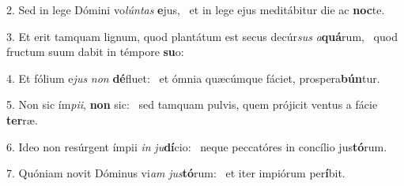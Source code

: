 2. Sed in lege Dómini vo\textit{lún}\textit{tas} \textbf{e}jus, \ast\  et in lege ejus meditábitur die ac \textbf{noc}te.\

3. Et erit tamquam lignum, quod plantátum est secus decúr\textit{sus} \textit{a}\textbf{quá}rum, \ast\  quod fructum suum dabit in témpore \textbf{su}o:\

4. Et fólium e\textit{jus} \textit{non} \textbf{dé}fluet: \ast\  et ómnia quæcúmque fáciet, prospera\textbf{bún}tur.\

5. Non sic ím\textit{pi}\textit{i}, \textbf{non} sic: \ast\  sed tamquam pulvis, quem prójicit ventus a fácie \textbf{ter}ræ.\

6. Ideo non resúrgent ímpii \textit{in} \textit{ju}\textbf{dí}cio: \ast\  neque peccatóres in concílio jus\textbf{tó}rum.\

7. Quóniam novit Dóminus vi\textit{am} \textit{jus}\textbf{tó}rum: \ast\  et iter impiórum per\textbf{í}bit.\


